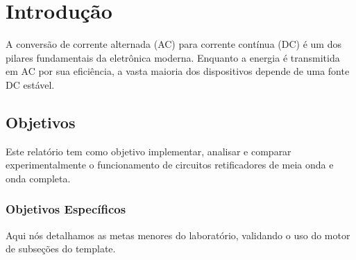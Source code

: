 
\chapter{Introdução}

A conversão de corrente alternada (AC) para corrente contínua (DC) é um dos pilares fundamentais da eletrônica moderna. Enquanto a energia é transmitida em AC por sua eficiência, a vasta maioria dos dispositivos depende de uma fonte DC estável.

\section{Objetivos}

Este relatório tem como objetivo implementar, analisar e comparar experimentalmente o funcionamento de circuitos retificadores de meia onda e onda completa.

\subsection{Objetivos Específicos}
Aqui nós detalhamos as metas menores do laboratório, validando o uso do motor de subseções do template.
